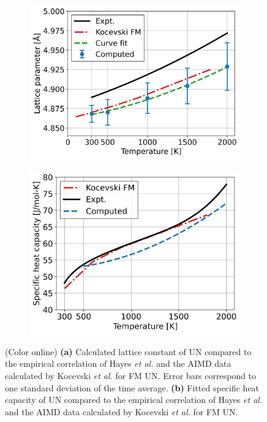 \documentclass[preprint, 12pt]{elsarticle}
\newcommand{\?}{\stackrel{?}{=}}
\begin{document}
\begin{figure}[h!]
\centering
\begin{subfigure}{0.48\textwidth}
    \includegraphics[width=\textwidth]{LatConst.png}
    \caption{}
    \label{Fig:LatConst}
\end{subfigure}
\hfill
\begin{subfigure}{0.48\textwidth}
    \includegraphics[width=\textwidth]{CP.png}
    \caption{}
    \label{Fig:CP}
\end{subfigure}
\caption{(Color online) \textbf{(a)} Calculated lattice constant of UN compared to the empirical correlation of Hayes \textit{et al.} \cite{Hayes1990I} and the AIMD data calculated by Kocevski \textit{et al.} \cite{Kocevski2023} for FM UN. Error bars correspond to one standard deviation of the time average. \textbf{(b)} Fitted specific heat capacity of UN compared to the empirical correlation of Hayes \textit{et al.} \cite{Hayes1990IV} and the AIMD data calculated by Kocevski \textit{et al.} for FM UN.}
\end{figure}
\end{document}
